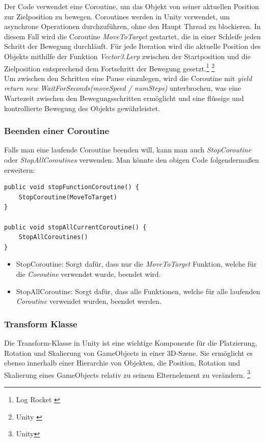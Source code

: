 Der Code verwendet eine Coroutine, um das Objekt von seiner aktuellen Position zur Zielposition zu bewegen. Coroutines werden in Unity verwendet, um asynchrone Operationen durchzuführen, ohne den Haupt Thread zu blockieren. In diesem Fall wird die Coroutine \textit{MoveToTarget} gestartet, die in einer Schleife jeden Schritt der Bewegung durchläuft. Für jede Iteration wird die aktuelle Position des Objekts mithilfe der Funktion \textit{Vector3.Lerp} zwischen der Startposition und die Zielposition entsprechend dem Fortschritt der Bewegung gesetzt.\protect\footnote{Log Rocket \cite{Coroutine2}} \footnote{ Unity \cite{Coroutine}}\\

Um zwischen den Schritten eine Pause einzulegen, wird die Coroutine mit \textit{yield return new WaitForSeconds(moveSpeed / numSteps)} unterbrochen, was eine Wartezeit zwischen den Bewegungsschritten ermöglicht und eine flüssige und kontrollierte Bewegung des Objekts gewährleistet.
\\
\subsubsection*{Beenden einer Coroutine}
Falls man eine laufende Coroutine beenden will, kann man auch \textit{StopCoroutine} oder \textit{StopAllCoroutines} verwenden. Man könnte den obigen Code folgendermaßen erweitern:
\begin{lstlisting}[style=csharp, caption={Coroutine beenden}, label=code:debugRaycast]
public void stopFunctionCoroutine() {
    StopCoroutine(MoveToTarget)
}

public void stopAllCurrentCoroutine() {
    StopAllCoroutines()
}
\end{lstlisting}
\begin{itemize}
    \item StopCoroutine: Sorgt dafür, dass nur die \textit{MoveToTarget} Funktion, welche für die \textit{Coroutine} verwendet wurde, beendet wird.
    \item StopAllCoroutine: Sorgt dafür, dass alle Funktionen, welche für alle laufenden \textit{Coroutine} verwendet wurden, beendet werden.
\end{itemize}

\subsubsection{\label{sec:Transform}Transform Klasse}
Die Transform-Klasse in Unity ist eine wichtige Komponente für die Platzierung, Rotation und Skalierung von GameObjects in einer 3D-Szene. Sie ermöglicht es ebenso innerhalb einer Hierarchie von Objekten, die Position, Rotation und Skalierung eines GameObjects relativ zu seinem Elternelement zu verändern. \protect\footnote{Unity\cite{Transform}}


